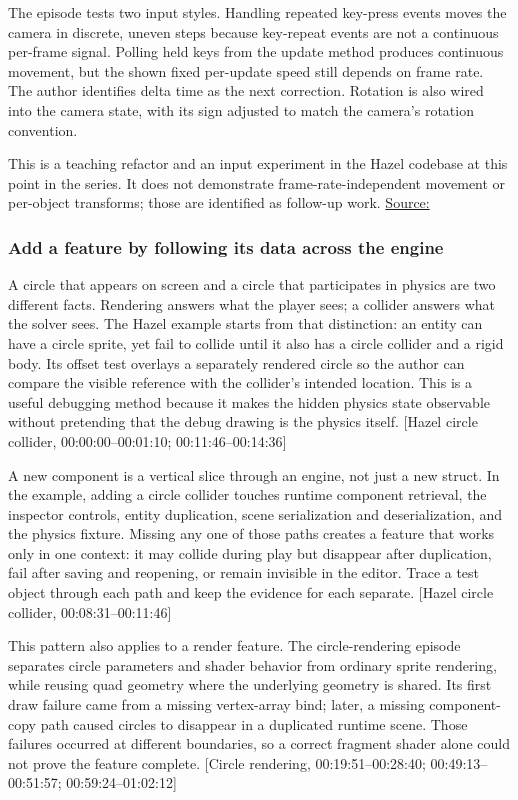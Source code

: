 The episode tests two input styles. Handling repeated key-press events moves the camera in discrete, uneven steps because key-repeat events are not a continuous per-frame signal. Polling held keys from the update method produces continuous movement, but the shown fixed per-update speed still depends on frame rate. The author identifies delta time as the next correction. Rotation is also wired into the camera state, with its sign adjusted to match the camera's rotation convention.

This is a teaching refactor and an input experiment in the Hazel codebase at this point in the series. It does not demonstrate frame-rate-independent movement or per-object transforms; those are identified as follow-up work. \href{https://www.youtube.com/watch?v=4zj-0FQ7Xbg}{Source:}

\subsubsection{Add a feature by following its data across the engine}\label{05-engine-i-ch013-add-a-feature-by-following-its-data-across-the-engine}

A circle that appears on screen and a circle that participates in physics are two different facts. Rendering answers what the player sees; a collider answers what the solver sees. The Hazel example starts from that distinction: an entity can have a circle sprite, yet fail to collide until it also has a circle collider and a rigid body. Its offset test overlays a separately rendered circle so the author can compare the visible reference with the collider's intended location. This is a useful debugging method because it makes the hidden physics state observable without pretending that the debug drawing is the physics itself. {[}Hazel circle collider, 00:00:00--00:01:10; 00:11:46--00:14:36{]}

A new component is a vertical slice through an engine, not just a new struct. In the example, adding a circle collider touches runtime component retrieval, the inspector controls, entity duplication, scene serialization and deserialization, and the physics fixture. Missing any one of those paths creates a feature that works only in one context: it may collide during play but disappear after duplication, fail after saving and reopening, or remain invisible in the editor. Trace a test object through each path and keep the evidence for each separate. {[}Hazel circle collider, 00:08:31--00:11:46{]}

This pattern also applies to a render feature. The circle-rendering episode separates circle parameters and shader behavior from ordinary sprite rendering, while reusing quad geometry where the underlying geometry is shared. Its first draw failure came from a missing vertex-array bind; later, a missing component-copy path caused circles to disappear in a duplicated runtime scene. Those failures occurred at different boundaries, so a correct fragment shader alone could not prove the feature complete. {[}Circle rendering, 00:19:51--00:28:40; 00:49:13--00:51:57; 00:59:24--01:02:12{]}

